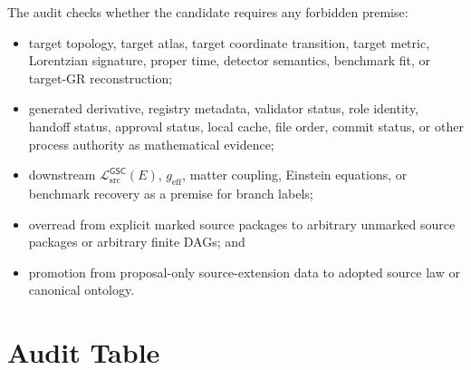 \documentclass[11pt]{article}
\newcommand{\MetricData}{\mathcal{L}_{\mathrm{src}}^{\mathsf{GSC}}}
\newcommand{\geff}{g_{\mathrm{eff}}}
\begin{document}
The audit checks whether the candidate requires any forbidden premise:
\begin{itemize}[leftmargin=*]
  \item target topology, target atlas, target coordinate transition, target
  metric, Lorentzian signature, proper time, detector semantics, benchmark
  fit, or target-GR reconstruction;
  \item generated derivative, registry metadata, validator status, role
  identity, handoff status, approval status, local cache, file order, commit
  status, or other process authority as mathematical evidence;
  \item downstream \(\MetricData(E)\), \(\geff\), matter coupling, Einstein
  equations, or benchmark recovery as a premise for branch labels;
  \item overread from explicit marked source packages to arbitrary unmarked
  source packages or arbitrary finite DAGs; and
  \item promotion from proposal-only source-extension data to adopted source
  law or canonical ontology.
\end{itemize}

\section{Audit Table}
\end{document}
